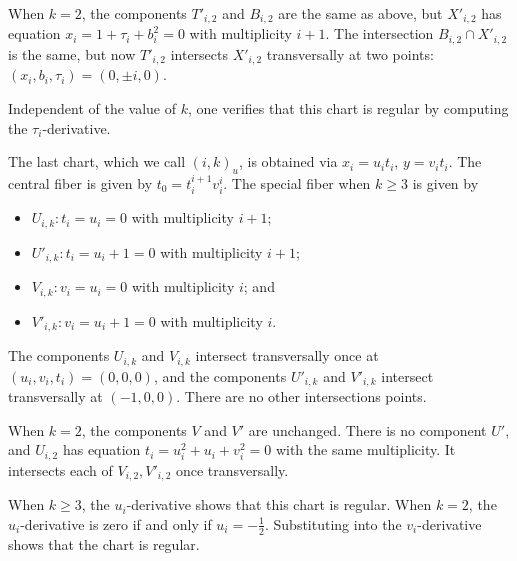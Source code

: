 \documentclass[pagesize,paper=letter]{scrartcl}
\theoremstyle{plain}
\theoremstyle{definition}
\theoremstyle{remark}
\begin{document}
When $k = 2$, the components $T'_{i,2}$ and $B_{i,2}$ are the same as above, but $X'_{i,2}$ has equation $x_i = 1+\tau_i+b_i^2 = 0$ with multiplicity $i+1$. The intersection $B_{i,2} \cap X'_{i,2}$ is the same, but now $T'_{i,2}$ intersects $X'_{i,2}$ transversally at two points: $(x_i, b_i, \tau_i) = (0, \pm i, 0)$.

Independent of the value of $k$, one verifies that this chart is regular by computing the $\tau_i$-derivative.

The last chart, which we call $(i,k)_u$, is obtained via $x_i = u_it_i$, $y = v_it_i$. The central fiber is given by $t_0 = t_i^{i+1}v_i^i$. The special fiber when $k \geq 3$ is given by
\begin{itemize}
    \item $U_{i,k}: t_i = u_i = 0$ with multiplicity $i+1$;
    \item $U'_{i,k}: t_i = u_i + 1 = 0$ with multiplicity $i+1$;
    \item $V_{i,k}: v_i = u_i = 0$ with multiplicity $i$; and
    \item $V'_{i,k}: v_i = u_i + 1 = 0$ with multiplicity $i$.
\end{itemize}
The components $U_{i,k}$ and $V_{i,k}$ intersect transversally once at $(u_i, v_i, t_i) = (0,0,0)$, and the components $U'_{i,k}$ and $V'_{i,k}$ intersect transversally at $(-1,0,0)$. There are no other intersections points.

When $k = 2$, the components $V$ and $V'$ are unchanged. There is no component $U'$, and $U_{i,2}$ has equation $t_i = u_i^2 + u_i + v_i^2 = 0$ with the same multiplicity. It intersects each of $V_{i,2}, V'_{i,2}$ once transversally.

When $k \geq 3$, the $u_i$-derivative shows that this chart is regular. When $k = 2$, the $u_i$-derivative is zero if and only if $u_i = -\frac12$. Substituting into the $v_i$-derivative shows that the chart is regular.





\end{document}
